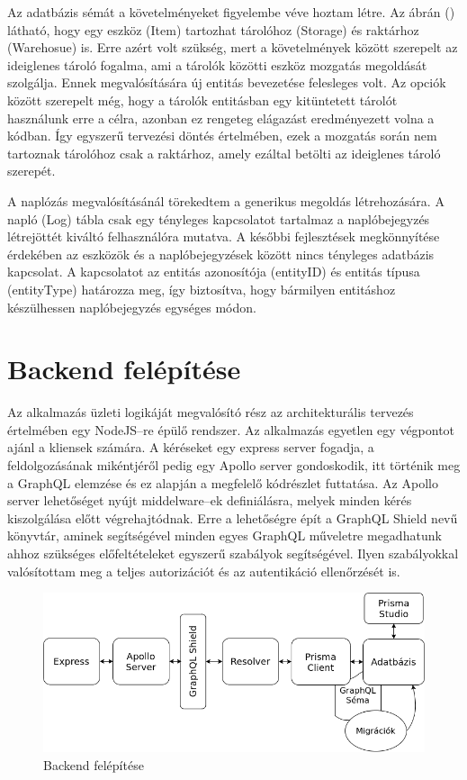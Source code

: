 Az adatbázis sémát a követelményeket figyelembe véve hoztam létre.
Az ábrán () látható, hogy egy eszköz (Item) tartozhat tárolóhoz (Storage) és raktárhoz (Warehosue) is. 
Erre azért volt szükség, mert a követelmények között szerepelt az ideiglenes tároló fogalma, ami a tárolók közötti eszköz mozgatás megoldását szolgálja.
Ennek megvalósítására új entitás bevezetése felesleges volt. Az opciók között szerepelt még, hogy a tárolók entitásban egy kitüntetett tárolót használunk erre a célra, azonban ez rengeteg elágazást eredményezett volna a kódban.
Így egyszerű tervezési döntés értelmében, ezek a mozgatás során nem tartoznak tárolóhoz csak a raktárhoz, amely ezáltal betölti az ideiglenes tároló szerepét.

A naplózás megvalósításánál törekedtem a generikus megoldás létrehozására.
A napló (Log) tábla csak egy tényleges kapcsolatot tartalmaz a naplóbejegyzés létrejöttét kiváltó felhasználóra mutatva.
A későbbi fejlesztések megkönnyítése érdekében az eszközök és a naplóbejegyzések között nincs tényleges adatbázis kapcsolat.
A kapcsolatot az entitás azonosítója (entityID) és entitás típusa (entityType) határozza meg, így biztosítva, hogy bármilyen entitáshoz készülhessen naplóbejegyzés egységes módon.

\section{Backend felépítése}
Az alkalmazás üzleti logikáját megvalósító rész az architekturális tervezés értelmében egy NodeJS–re épülő rendszer.
Az alkalmazás egyetlen egy végpontot ajánl a kliensek számára.
A kéréseket egy express server fogadja, a feldolgozásának mikéntjéről pedig egy Apollo server gondoskodik, itt történik meg a GraphQL elemzése és ez alapján a megfelelő kódrészlet futtatása.
Az Apollo server lehetőséget nyújt middelware–ek definiálásra, melyek minden kérés kiszolgálása előtt végrehajtódnak.
Erre a lehetőségre épít a GraphQL Shield nevű könyvtár, aminek segítségével minden egyes GraphQL műveletre megadhatunk ahhoz szükséges előfeltételeket egyszerű szabályok segítségével.
Ilyen szabályokkal valósítottam meg a teljes autorizációt és az autentikáció ellenőrzését is.

\begin{figure}[!ht]
  \centering
  \includegraphics[width=150mm, keepaspectratio]{figures/backend.png}
  \caption{Backend felépítése}
  \label{fig:backend}
\end{figure}

